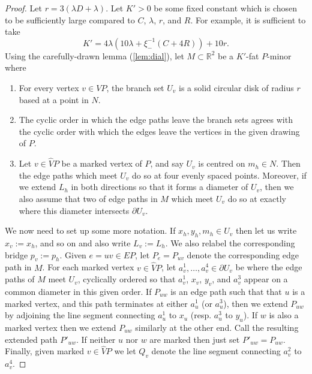 \documentclass[10pt,a4paper]{amsart}
\newcommand{\R}{\mathbb{R}}
\theoremstyle{definition}
\begin{document}
\begin{proof}
    Let $r = 3(\lambda D + \lambda)$. Let $K' > 0$ be some fixed constant which is chosen to be sufficiently large compared to $C$, $\lambda$, $r$, and $R$. For example, it is sufficient to take 
    $$
    K' = 4\lambda (10\lambda + \xi_-^{-1}(C + 4R)) + 10r.
    $$
    Using the carefully-drawn lemma (\ref{lem:dial}), let $M \subset \R^2$ be a $K'$-fat $P$-minor where
    \begin{enumerate}

         \item For every vertex $v \in VP$, the branch set $U_v$ is a solid circular disk of radius $r$ based at a point in $N$. 
 
		\item The cyclic order in which the edge paths leave the branch sets agrees with the cyclic  order with which the edges leave the vertices in the given drawing of $P$.

        
        \item Let $v \in \widehat VP$ be a marked vertex of $P$, and say $U_v$ is centred on $m_h \in N$. Then the edge paths which meet $U_v$ do so at four evenly spaced points. Moreover, if we extend $L_h$ in both directions so that it forms a diameter of $U_v$, then we also assume that two of edge paths in $M$ which meet $U_v$ do so at exactly where this diameter intersects $\partial U_v$. 
        
        
     \end{enumerate}

     
     We now need to set up some more notation. If $x_h, y_h, m_h \in U_v$ then let us write $x_v := x_h$, and so on and also write $L_v := L_h$. We also relabel the corresponding bridge $p_v := p_h$. Given $e = uv \in EP$, let $P_e = P_{uv}$ denote the corresponding edge path in $M$. 
     For each marked vertex $v \in \widehat VP$, let $a_v^{1}, \ldots, a_v^4 \in \partial U_v$ be where the edge paths of $M$ meet $U_v$, cyclically ordered so that $a_v^1$, $x_v$, $y_v$, and $a_v^3$ appear on a common diameter in this given order.
     If $P_{uw}$ is an edge path such that that $u$ is a marked vertex, and this path terminates at either $a_u^1$ (or $a_u^3$), then we extend $P_{uw}$ by adjoining the line segment connecting $a_u^1$ to $x_u$ (resp. $a_u^3$ to $y_u$). If $w$ is also a marked vertex then we extend $P_{uw}$ similarly at the other end. Call the resulting extended path $P'_{uw}$. If neither $u$ nor $w$ are marked then just set $P'_{uw} = P_{uw}$. Finally, given marked $v \in \widehat VP$ we let $Q_v$ denote the line segment connecting $a_v^2$ to $a_v^4$. 
     

\end{proof}
\end{document}
